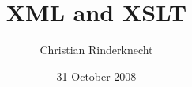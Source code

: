 
%
\usepackage{graphicx}

%
\usepackage[english]{babel}
\usepackage[T1]{fontenc}
\usepackage[scaled=0.8]{beramono}

%
\usepackage{amssymb,amsmath}

%
\usepackage{url,xspace}
\usepackage{booktabs}

%





%
\renewcommand{\refname}{}

\newcommand\MIME{\textsf{MIME}\xspace}
\newcommand\XML{\textsf{XML}\xspace}
\newcommand\HTML{\textsf{HTML}\xspace}
\newcommand\XHTML{\textsf{XHTML}\xspace}
\newcommand\DTD{\textsf{DTD}\xspace}
\newcommand\XPath{\textsf{XPath}\xspace}
\newcommand\XSLT{\textsf{XSLT}\xspace}
\newcommand\Clang{\textsf{C}\xspace}
\newcommand\Cpp{\textsf{CPP}\xspace}
\newcommand\Perl{\textsf{Perl}\xspace}
\newcommand\Java{\textsf{Java}\xspace}
\newcommand\Saxon{\textsf{Saxon}\xspace}
\newcommand\Unicode{\textsf{unicode}\xspace}
\newcommand\ASCII{\textsf{ASCII}\xspace}

%
\title{XML and XSLT}
\author{Christian Rinderknecht}
\date{31 October 2008}



\frame{\maketitle}




